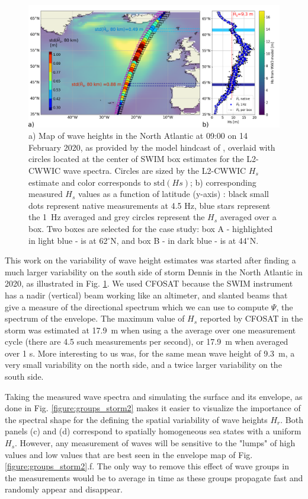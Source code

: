 {{%
\begin{figure}[h!]
\centerline{\includegraphics[width=\textwidth]{FIGS_CH_GROUPS/DeCarlo_fig1.pdf}}
    \caption{a) Map of wave heights in the North Atlantic at 09:00 on 14 February 2020, as provided by the model hindcast of \cite{Alday&al.2021}, overlaid with circles located at the center of SWIM box estimates for the L2-CWWIC wave spectra. Circles are sized by the L2-CWWIC $H_s$ estimate and color corresponds to $\mathrm{std}(Hs)$; b) corresponding measured $H_s$ values as a function of latitude (y-axis) : black small dots represent native measurements at 4.5 Hz, blue stars represent the 1~Hz averaged and grey circles represent the $H_s$ averaged over a box. Two boxes are selected for the case study: box A - highlighted in light blue - is at 62$^\circ$N, and box B - in dark blue - is at 44$^\circ$N.} 
   \label{figure:groups_storm1}
\end{figure}
This work on the variability of wave height estimates was started after finding a much larger variability on the south side of storm Dennis in the North Atlantic in 2020, as illustrated in Fig. \ref{figure:groups_storm1}. We used CFOSAT because the SWIM instrument has a nadir (vertical) beam working like an altimeter, and slanted beams that give a measure of the directional spectrum which we can use to compute $\Psi$, the spectrum of the envelope. The maximum value of $H_s$ reported by CFOSAT in the storm was estimated at 17.9~m when using a the average over one measurement cycle (there are 4.5 such measurements per second), or 17.9~m when averaged over 1 s. More interesting to us was, for the same mean wave height of 9.3~m, a very small variability on the north side, and a twice larger variability on the south side. 

Taking the measured wave spectra and simulating the surface and its envelope, as done in Fig. \ref{figure:groups_storm2} makes it easier to visualize the importance of the spectral shape for the defining the spatial variability of wave heights $H_r$. Both panels (c) and (d) correspond to spatially homogeneous sea states with a uniform $H_s$. However, any measurement of waves will be sensitive to the "lumps" of high values and low values that are best seen in the envelope map of Fig. \ref{figure:groups_storm2}.f. The only way to remove this effect of wave groups in the measurements would be to average in time as these groups propagate fast and randomly appear and disappear. 

}}

